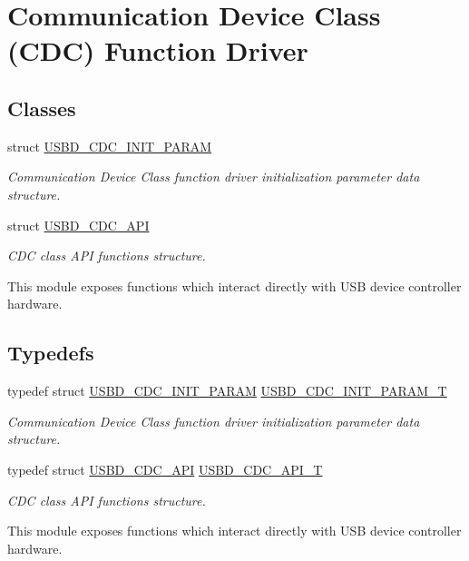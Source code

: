 \hypertarget{group___u_s_b_d___c_d_c}{}\section{Communication Device Class (C\+DC) Function Driver}
\label{group___u_s_b_d___c_d_c}
\subsection*{Classes}
\begin{DoxyCompactItemize}
\item 
struct \hyperlink{struct_u_s_b_d___c_d_c___i_n_i_t___p_a_r_a_m}{U\+S\+B\+D\+\_\+\+C\+D\+C\+\_\+\+I\+N\+I\+T\+\_\+\+P\+A\+R\+AM}
\begin{DoxyCompactList}\small\item\em Communication Device Class function driver initialization parameter data structure. \end{DoxyCompactList}\item 
struct \hyperlink{struct_u_s_b_d___c_d_c___a_p_i}{U\+S\+B\+D\+\_\+\+C\+D\+C\+\_\+\+A\+PI}
\begin{DoxyCompactList}\small\item\em C\+DC class A\+PI functions structure.

This module exposes functions which interact directly with U\+SB device controller hardware. \end{DoxyCompactList}\end{DoxyCompactItemize}
\subsection*{Typedefs}
\begin{DoxyCompactItemize}
\item 
typedef struct \hyperlink{struct_u_s_b_d___c_d_c___i_n_i_t___p_a_r_a_m}{U\+S\+B\+D\+\_\+\+C\+D\+C\+\_\+\+I\+N\+I\+T\+\_\+\+P\+A\+R\+AM} \hyperlink{group___u_s_b_d___c_d_c_ga78b2c5f20653181161c59062795233b3}{U\+S\+B\+D\+\_\+\+C\+D\+C\+\_\+\+I\+N\+I\+T\+\_\+\+P\+A\+R\+A\+M\+\_\+T}
\begin{DoxyCompactList}\small\item\em Communication Device Class function driver initialization parameter data structure. \end{DoxyCompactList}\item 
typedef struct \hyperlink{struct_u_s_b_d___c_d_c___a_p_i}{U\+S\+B\+D\+\_\+\+C\+D\+C\+\_\+\+A\+PI} \hyperlink{group___u_s_b_d___c_d_c_gaad7f61aed01ad4130bee0f50b17eb716}{U\+S\+B\+D\+\_\+\+C\+D\+C\+\_\+\+A\+P\+I\+\_\+T}
\begin{DoxyCompactList}\small\item\em C\+DC class A\+PI functions structure.

This module exposes functions which interact directly with U\+SB device controller hardware. \end{DoxyCompactList}\end{DoxyCompactItemize}



